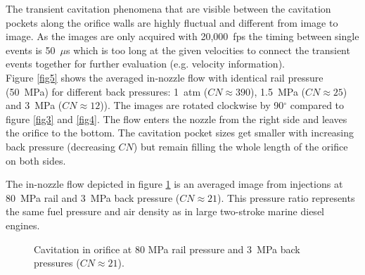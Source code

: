 \documentclass[letterpaper,twocolumn,10pt]{ilass}
\begin{document}
The transient cavitation phenomena that are visible between the cavitation pockets along the
orifice walls are highly fluctual and different from image to image.  As the images are only
acquired with 20,000~fps the timing between single events is 50~$\mu$s which is too long at
the given velocities to connect the transient events together for further evaluation
(e.g. velocity information).\\
%
Figure \ref{fig5} shows the averaged in-nozzle flow with identical rail pressure (50~MPa)
for different back pressures: 1~atm ($CN \approx 390$), 1.5~MPa ($CN \approx 25$) and 3~MPa
($CN \approx 12$)). The images are rotated clockwise by 90$^{\circ}$ compared to figure
\ref{fig3} and \ref{fig4}. The flow enters the nozzle from the right side and leaves the
orifice to the bottom. The cavitation pocket sizes get smaller with increasing back pressure
(decreasing $CN$) but remain filling the whole length of the orifice on both sides.
%

The in-nozzle flow depicted in figure \ref{fig6} is an averaged image from injections at
80~MPa rail and 3~MPa back pressure ($CN \approx 21$). This pressure ratio represents the
same fuel pressure and air density as in large two-stroke marine diesel engines.
%


\begin{figure}[h]
\begin{center}
\end{center}
\vspace*{-2mm}
\caption{Cavitation in orifice at 80 MPa rail pressure and 3~MPa back pressures ($CN \approx 21$).}
\label{fig6} 
\end{figure}
\end{document}
